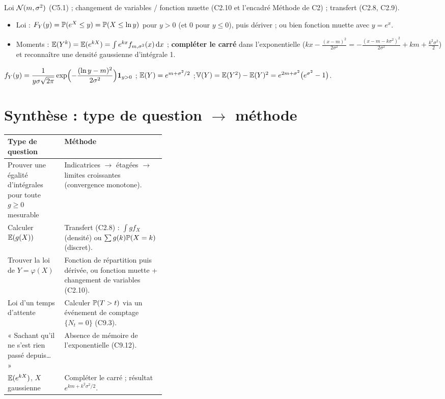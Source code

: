 \documentclass[11pt,a4paper]{article}
\begin{document}
\begin{exo}
\outils Loi $\mathcal{N}(m,\sigma^2)$ (C5.1) ; changement de variables / fonction muette (C2.10 et l'encadré Méthode de C2) ; transfert (C2.8, C2.9).

\meth
\begin{itemize}
  \item Loi : $F_Y(y)=\mathbb{P}(e^X\le y)=\mathbb{P}(X\le\ln y)$ pour $y>0$ (et $0$ pour $y\le0$), puis dériver ; ou bien fonction muette avec $y=e^x$.
  \item Moments : $\mathbb{E}(Y^k)=\mathbb{E}(e^{kX})=\int e^{kx}f_{m,\sigma^2}(x)\,\mathrm{d} x$ ; \textbf{compléter le carré} dans l'exponentielle
  ($kx-\frac{(x-m)^2}{2\sigma^2}=-\frac{(x-m-k\sigma^2)^2}{2\sigma^2}+km+\frac{k^2\sigma^2}2$) et reconnaître une densité gaussienne d'intégrale 1.
\end{itemize}

\rep $f_Y(y)=\dfrac{1}{y\sigma\sqrt{2\pi}}\exp\Bigl(-\dfrac{(\ln y-m)^2}{2\sigma^2}\Bigr)\mathbf{1}_{y>0}$ ;\quad
$\mathbb{E}(Y)=e^{m+\sigma^2/2}$ ;\quad $\operatorname{\mathbb{V}}(Y)=\mathbb{E}(Y^2)-\mathbb{E}(Y)^2=e^{2m+\sigma^2}\bigl(e^{\sigma^2}-1\bigr)$.
\end{exo}

\section*{Synthèse : type de question $\to$ méthode}
\renewcommand{\arraystretch}{1.3}
\begin{tabularx}{\linewidth}{@{}>{\raggedright\arraybackslash}p{0.36\linewidth}X@{}}
\toprule
Type de question & Méthode\\\midrule
Prouver une égalité d'intégrales pour toute $g\ge0$ mesurable & Indicatrices $\to$ étagées $\to$ limites croissantes (convergence monotone).\\
Calculer $\mathbb{E}(g(X))$ & Transfert (C2.8) : $\int g f_X$ (densité) ou $\sum g(k)\mathbb{P}(X=k)$ (discret).\\
Trouver la loi de $Y=\varphi(X)$ & Fonction de répartition puis dérivée, ou fonction muette + changement de variables (C2.10).\\
Loi d'un temps d'attente & Calculer $\mathbb{P}(T>t)$ via un événement de comptage $\{N_t=0\}$ (C9.3).\\
« Sachant qu'il ne s'est rien passé depuis… » & Absence de mémoire de l'exponentielle (C9.12).\\
$\mathbb{E}(e^{kX})$, $X$ gaussienne & Compléter le carré ; résultat $e^{km+k^2\sigma^2/2}$.\\\bottomrule
\end{tabularx}
\end{document}
